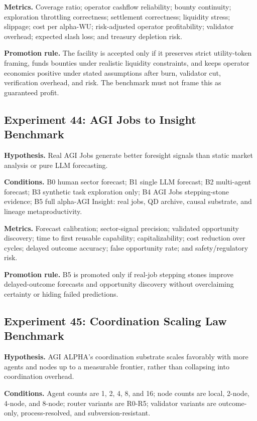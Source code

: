 \documentclass[
  11pt,
]{article}
\begin{document}
\textbf{Metrics.} Coverage ratio; operator cashflow reliability; bounty
continuity; exploration throttling correctness; settlement correctness;
liquidity stress; slippage; cost per alpha-WU; risk-adjusted operator
profitability; validator overhead; expected slash loss; and treasury
depletion risk.

\textbf{Promotion rule.} The facility is accepted only if it preserves
strict utility-token framing, funds bounties under realistic liquidity
constraints, and keeps operator economics positive under stated
assumptions after burn, validator cut, verification overhead, and risk.
The benchmark must not frame this as guaranteed profit.

\subsection{Experiment 44: AGI Jobs to Insight
Benchmark}\label{experiment-44-agi-jobs-to-insight-benchmark}

\textbf{Hypothesis.} Real AGI Jobs generate better foresight signals
than static market analysis or pure LLM forecasting.

\textbf{Conditions.} B0 human sector forecast; B1 single LLM forecast;
B2 multi-agent forecast; B3 synthetic task exploration only; B4 AGI Jobs
stepping-stone evidence; B5 full alpha-AGI Insight: real jobs, QD
archive, causal substrate, and lineage metaproductivity.

\textbf{Metrics.} Forecast calibration; sector-signal precision;
validated opportunity discovery; time to first reusable capability;
capitalizability; cost reduction over cycles; delayed outcome accuracy;
false opportunity rate; and safety/regulatory risk.

\textbf{Promotion rule.} B5 is promoted only if real-job stepping stones
improve delayed-outcome forecasts and opportunity discovery without
overclaiming certainty or hiding failed predictions.

\subsection{Experiment 45: Coordination Scaling Law
Benchmark}\label{experiment-45-coordination-scaling-law-benchmark}

\textbf{Hypothesis.} AGI ALPHA's coordination substrate scales favorably
with more agents and nodes up to a measurable frontier, rather than
collapsing into coordination overhead.

\textbf{Conditions.} Agent counts are 1, 2, 4, 8, and 16; node counts
are local, 2-node, 4-node, and 8-node; router variants are R0-R5;
validator variants are outcome-only, process-resolved, and
subversion-resistant.
\end{document}
